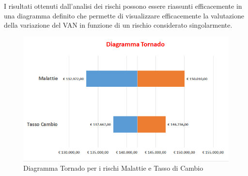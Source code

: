 I risultati ottenuti dall'analisi dei rischi possono essere riassunti efficacemente in una diagramma definito che permette di visualizzare efficacemente la valutazione della variazione del VAN in funzione di un rischio considerato singolarmente.
\begin{figure}[htbp]
\centering
\includegraphics[scale=0.7]{immagini/Tornado.png}
\caption{Diagramma Tornado per i rischi Malattie e Tasso di Cambio \label{fig:tornado}}
\end{figure}